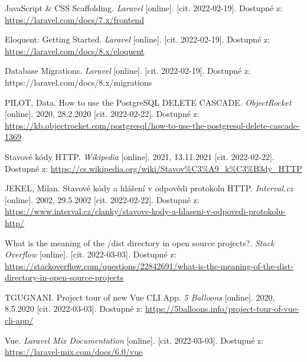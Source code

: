 \begin{thebibliography}{55}
JavaScript \& CSS Scaffolding. \textit{Laravel} [online]. [cit. 2022-02-19]. Dostupné z: \url{https://laravel.com/docs/7.x/frontend}

Eloquent: Getting Started. \textit{Laravel} [online]. [cit. 2022-02-19]. Dostupné z: \url{https://laravel.com/docs/8.x/eloquent}

Database Migrations. \textit{Laravel} [online]. [cit. 2022-02-19]. Dostupné z: https://laravel.com/docs/8.x/migrations

PILOT, Data. How to use the PostgreSQL DELETE CASCADE. \textit{ObjectRocket} [online]. 2020, 28.2.2020 [cit. 2022-02-22]. Dostupné z: \url{https://kb.objectrocket.com/postgresql/how-to-use-the-postgresql-delete-cascade-1369}

Stavové kódy HTTP. \textit{Wikipedia} [online]. 2021, 13.11.2021 [cit. 2022-02-22]. Dostupné z: \url{https://cs.wikipedia.org/wiki/Stavov%C3%A9\_k%C3%B3dy\_HTTP}

JEKEL, Milan. Stavové kódy a hlášení v odpovědi protokolu HTTP. \textit{Interval.cz} [online]. 2002, 29.5.2002 [cit. 2022-02-22]. Dostupné z: \url{https://www.interval.cz/clanky/stavove-kody-a-hlaseni-v-odpovedi-protokolu-http/}

What is the meaning of the /dist directory in open source projects?. \textit{Stack Overflow} [online]. [cit. 2022-03-03]. Dostupné z: \url{https://stackoverflow.com/questions/22842691/what-is-the-meaning-of-the-dist-directory-in-open-source-projects}

TGUGNANI. Project tour of new Vue CLI App. \textit{5 Balloons} [online]. 2020, 8.5.2020 [cit. 2022-03-03]. Dostupné z: \url{https://5balloons.info/project-tour-of-vue-cli-app/}

Vue. \textit{Laravel Mix Documentation} [online]. [cit. 2022-03-03]. Dostupné z: \url{https://laravel-mix.com/docs/6.0/vue}

\end{thebibliography}